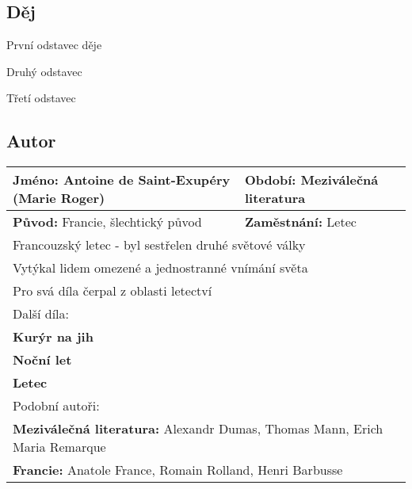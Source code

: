 \subsection*{Děj}
První odstavec děje

Druhý odstavec

Třetí odstavec
\subsection*{Autor}
\begin{tabularx}{\linewidth}{l|l}
    \textbf{Jméno:} Antoine de Saint-Exupéry (Marie Roger) & \textbf{Období:} Meziválečná literatura       \\
    \hline
    \textbf{Původ:} Francie, šlechtický původ              & \textbf{Zaměstnání:} Letec                    \\
    \hline
    \multicolumn{2}{l}{Francouzský letec - byl sestřelen druhé světové války}                              \\
    \multicolumn{2}{l}{Vytýkal lidem omezené a jednostranné vnímání světa}                                 \\
    \multicolumn{2}{l}{Pro svá díla čerpal z oblasti letectví}                                             \\
    \hline
    \multicolumn{2}{l}{Další díla:}                                                                        \\
    \multicolumn{2}{l}{\textbf{Kurýr na jih}}                                                              \\
    \multicolumn{2}{l}{\textbf{Noční let}}                                                                 \\
    \multicolumn{2}{l}{\textbf{Letec}}                                                                     \\
    \hline
    \multicolumn{2}{l}{Podobní autoři:}                                                                    \\
    \multicolumn{2}{l}{\textbf{Meziválečná literatura:} Alexandr Dumas, Thomas Mann, Erich Maria Remarque} \\
    \multicolumn{2}{l}{\textbf{Francie:} Anatole France, Romain Rolland, Henri Barbusse}                   \\
\end{tabularx}
